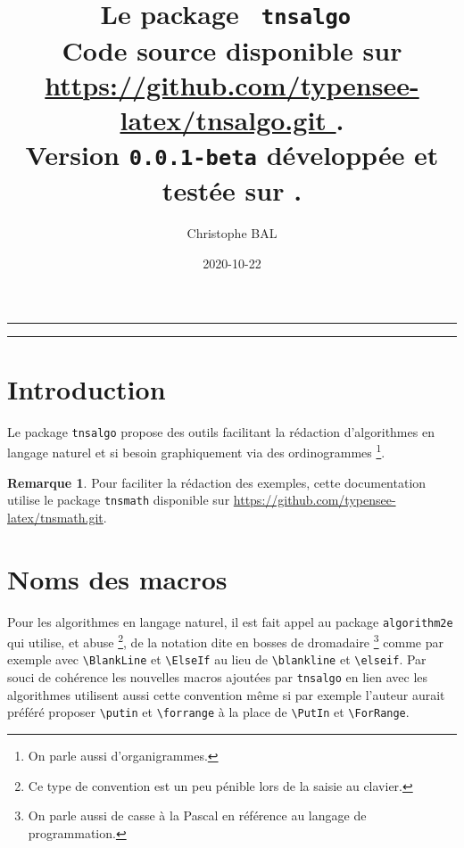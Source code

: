 \documentclass[12pt,a4paper]{article}
\theoremstyle{definition}
\newtheorem*{remark}{Remarque}
\newcommand\env[1]{\texttt{#1}}
\newcommand\macro[1]{\env{\textbackslash{}#1}}
\begin{document}
\renewcommand\labelitemi{\raisebox{0.125em}{\tiny\textbullet}}
\renewcommand{\labelitemii}{---}

\title{   %
	Le package \texttt{ tnsalgo }\\%
	{\footnotesize Code source disponible sur \url{ https://github.com/typensee-latex/tnsalgo.git }.}\\%
{\footnotesize Version \texttt{0.0.1-beta} développée et testée sur \macosxname{}.}%
}
\author{Christophe BAL}
\date{2020-10-22}

\maketitle


\vspace{2em}

\hrule

\tableofcontents

\vspace{1.5em}

\hrule

\newpage

\section{Introduction}

Le package \verb#tnsalgo# propose des outils facilitant la rédaction d'algorithmes en langage naturel et si besoin graphiquement via des ordinogrammes
\footnote{
	On parle aussi d'organigrammes.
}.


\begin{remark}
	Pour faciliter la rédaction des exemples, cette documentation utilise le package \verb#tnsmath# disponible sur \url{https://github.com/typensee-latex/tnsmath.git}.
\end{remark}
\section{Noms des macros}


Pour les algorithmes en langage naturel, il est fait appel au package \verb#algorithm2e# qui utilise, et abuse
\footnote{
	Ce type de convention est un peu pénible lors de la saisie au clavier.
},
de la notation dite en bosses de dromadaire
\footnote{
	 On parle aussi de casse à la Pascal en référence au langage de programmation.
}
comme par exemple avec \macro{BlankLine} et \macro{ElseIf} au lieu de \macro{blankline} et \macro{elseif}.
Par souci de cohérence les nouvelles macros ajoutées par \verb#tnsalgo# en lien avec les algorithmes utilisent aussi cette convention même si par exemple l'auteur aurait préféré proposer \macro{putin} et \macro{forrange} à la place de \macro{PutIn} et \macro{ForRange}.
\end{document}
